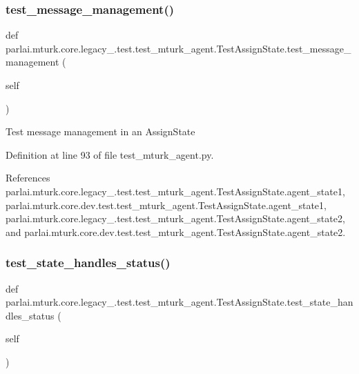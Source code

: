 \subsubsection{\texorpdfstring{test\+\_\+message\+\_\+management()}{test\_message\_management()}}
{\footnotesize\ttfamily def parlai.\+mturk.\+core.\+legacy\+\_.\+test.\+test\+\_\+mturk\+\_\+agent.\+Test\+Assign\+State.\+test\+\_\+message\+\_\+management (\begin{DoxyParamCaption}\item[{}]{self }\end{DoxyParamCaption})}

\begin{DoxyVerb}Test message management in an AssignState\end{DoxyVerb}
 

Definition at line 93 of file test\+\_\+mturk\+\_\+agent.\+py.



References parlai.\+mturk.\+core.\+legacy\+\_.\+test.\+test\+\_\+mturk\+\_\+agent.\+Test\+Assign\+State.\+agent\+\_\+state1, parlai.\+mturk.\+core.\+dev.\+test.\+test\+\_\+mturk\+\_\+agent.\+Test\+Assign\+State.\+agent\+\_\+state1, parlai.\+mturk.\+core.\+legacy\+\_.\+test.\+test\+\_\+mturk\+\_\+agent.\+Test\+Assign\+State.\+agent\+\_\+state2, and parlai.\+mturk.\+core.\+dev.\+test.\+test\+\_\+mturk\+\_\+agent.\+Test\+Assign\+State.\+agent\+\_\+state2.

\mbox{\label{classparlai_1_1mturk_1_1core_1_1legacy__2018_1_1test_1_1test__mturk__agent_1_1TestAssignState_a5283dee3082b124f1c3892d98ca11fa5}} 
\subsubsection{\texorpdfstring{test\+\_\+state\+\_\+handles\+\_\+status()}{test\_state\_handles\_status()}}
{\footnotesize\ttfamily def parlai.\+mturk.\+core.\+legacy\+\_.\+test.\+test\+\_\+mturk\+\_\+agent.\+Test\+Assign\+State.\+test\+\_\+state\+\_\+handles\+\_\+status (\begin{DoxyParamCaption}\item[{}]{self }\end{DoxyParamCaption})}

